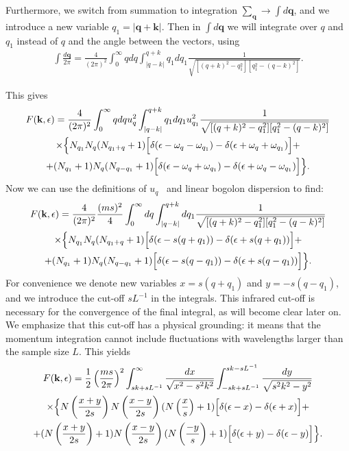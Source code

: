 %
Furthermore, we switch from summation to integration $\sum_{\mathbf{q}}\rightarrow\int d\mathbf{q}$, and we introduce a new variable $q_1=|\textbf{q}+\textbf{k}|$.
Then in $\int d\mathbf{q}$ we will integrate over $q$ and $q_1$ instead of $q$ and the angle between the vectors, using
%
\begin{eqnarray}
\int\frac{d\mathbf{q}}{2\pi}=\frac{4}{(2\pi)^2}\int_0^\infty qdq\int_{|q-k|}^{q+k}q_1dq_1
\frac{1}{\sqrt{[(q+k)^2-q_1^2][q_1^2-(q-k)^2]}}.
\end{eqnarray}
%

This gives
%
\begin{gather}
F(\textbf{k},\epsilon)=\frac{4}{(2\pi)^2}\int_0^\infty
qdq 
u^2_{q}
\int_{|q-k|}^{q+k}
q_1dq_1
u^2_{q_1}
\frac{1}{\sqrt{[(q+k)^2-q_1^2][q_1^2-(q-k)^2]}}\\
\nonumber
\times\Bigl\{
N_{q_1}N_{q}(N_{q_1+q}+1)
\Bigl[\delta(\epsilon-\omega_{q}-\omega_{q_1})
-
\delta(\epsilon+\omega_{q}+\omega_{q_1})\Bigl]+\\
\nonumber
+
(N_{q_1}+1)N_{q}(N_{q-q_1}+1)
\Bigr[\delta(\epsilon-\omega_{q}+\omega_{q_1})
-
\delta(\epsilon+\omega_{q}-\omega_{q_1})\Bigr]
\Bigr\}.
\end{gather}
%
Now we can use the definitions of $u_q$~\cite{Giorgini:1998aa} and linear bogolon dispersion to find:
%
\begin{gather}
F(\textbf{k},\epsilon)=\frac{4}{(2\pi)^2}\frac{(ms)^2}{4}
\int_0^\infty dq 
\int_{|q-k|}^{q+k} dq_1
\frac{1}{\sqrt{[(q+k)^2-q_1^2][q_1^2-(q-k)^2]}}\\
\nonumber
\times
\Bigl\{
N_{q_1}N_{q}(N_{q_1+q}+1)
\Bigl[\delta(\epsilon-s(q+q_1))
-
\delta(\epsilon+s(q+q_1))\Bigl]+\\
\nonumber
+
(N_{q_1}+1)N_{q}(N_{q-q_1}+1)
\Bigr[\delta(\epsilon-s(q-q_1))
-
\delta(\epsilon+s(q-q_1))\Bigr]
\Bigr\}.
\end{gather}
%
For convenience we denote new variables $x=s(q+q_1)$ and $y=-s(q-q_1)$, and we introduce the cut-off $sL^{-1}$ in the integrals. This infrared cut-off is necessary for the convergence of the final integral, as will become clear later on. We emphasize that this cut-off has a physical grounding: it means that the momentum integration cannot include fluctuations with wavelengths larger than the sample size $L$. This yields
%
\begin{gather}
F(\textbf{k},\epsilon)=\frac{1}{2}\left(\frac{ms}{2\pi}\right)^2
\int_{sk+sL^{-1}}^\infty \frac{dx}{\sqrt{x^2-s^2k^2}}
\int_{-sk+sL^{-1}}^{sk-sL^{-1}} \frac{dy}{\sqrt{s^2k^2-y^2}}
\\
\nonumber
\times
\Bigl\{
N\left(\frac{x+y}{2s}\right)N\left(\frac{x-y}{2s}\right)(N\left(\frac{x}{s}\right)+1)
\Bigl[\delta(\epsilon-x)
-
\delta(\epsilon+x)\Bigl]+\\
\nonumber
+
(N\left(\frac{x+y}{2s}\right)+1)N\left(\frac{x-y}{2s}\right)(N\left(\frac{-y}{s}\right)+1)
\Bigr[\delta(\epsilon+y)
-
\delta(\epsilon-y)\Bigr]
\Bigr\}.
\end{gather}
